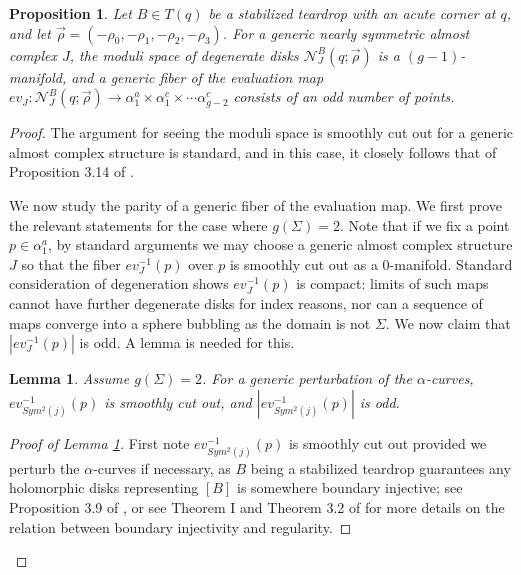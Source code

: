 \documentclass{amsart}
\newtheorem{lem}[thm]{Lemma}
\newtheorem{prop}[thm]{Proposition}
\theoremstyle{definition}
\theoremstyle{remark}
\numberwithin{equation}{section}
\numberwithin{equation}{section} \makeatletter
\begin{document}
\begin{prop}\label{Proposition, fiber of evaluation map of degenerate disks is odd when rho is cyclic}
Let $B\in T(q)$ be a stabilized teardrop with an acute corner at $q$, and let $\overrightarrow{\rho}=(-\rho_0,-\rho_1,-\rho_2,-\rho_3)$. For a generic nearly symmetric almost complex $J$, the moduli space of degenerate disks $\mathcal{N}_J^B(q;\overrightarrow{\rho})$ is a $(g-1)$-manifold, and a generic fiber of the evaluation map $ev_J:\mathcal{N}_J^B(q;\overrightarrow{\rho})\rightarrow \alpha^a_1\times \alpha^c_1\times\cdots\alpha^c_{g-2}$ consists of an odd number of points. 
\end{prop}
\begin{proof}
The argument for seeing the moduli space is smoothly cut out for a generic almost complex structure is standard, and in this case, it closely follows that of Proposition 3.14 of \cite{OS04}. 

We now study the parity of a generic fiber of the evaluation map. We first prove the relevant statements for the case where $g(\Sigma)=2$. Note that if we fix a point $p\in \alpha^a_1$, by standard arguments we may choose a generic almost complex structure $J$ so that the fiber $ev_J^{-1}(p)$ over $p$ is smoothly cut out as a $0$-manifold. Standard consideration of degeneration shows $ev_J^{-1}(p)$ is compact: limits of such maps cannot have further degenerate disks for index reasons, nor can a sequence of maps converge into a sphere bubbling as the domain is not $\Sigma$. We now claim that $|ev_J^{-1}(p)|$ is odd. A lemma is needed for this.
\begin{lem}\label{Lemma, fiber of degenerate disks over symmetric almost complex structures, rho is cyclic}
Assume $g(\Sigma)=2$. For a generic perturbation of the $\alpha$-curves, $ev_{Sym^2(j)}^{-1}(p)$ is smoothly cut out, and $|ev_{Sym^2(j)}^{-1}(p)|$ is odd. 
\end{lem}
\begin{proof}[Proof of Lemma \ref{Lemma, fiber of degenerate disks over symmetric almost complex structures, rho is cyclic}]
First note $ev_{Sym^2(j)}^{-1}(p)$ is smoothly cut out provided we perturb the $\alpha$-curves if necessary, as $B$ being a stabilized teardrop guarantees any holomorphic disks representing $[B]$ is somewhere boundary injective; see Proposition 3.9 of \cite{OS04}, or see Theorem I and Theorem 3.2 of \cite{Oh1996} for more details on the relation between boundary injectivity and regularity. 


\end{proof}
\end{proof}
\end{document}
